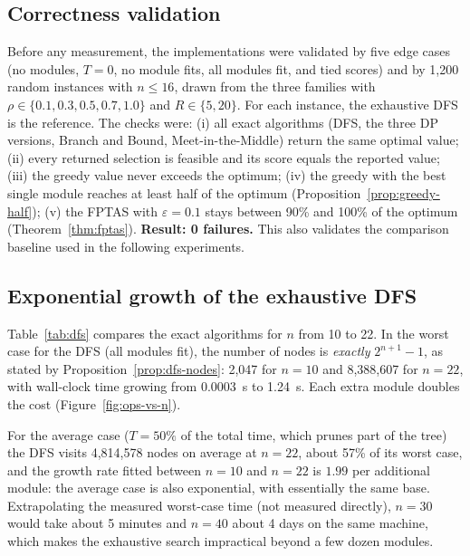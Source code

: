 \subsection{Correctness validation}

Before any measurement, the implementations were validated by five edge cases (no modules, $T=0$, no module fits, all modules fit, and tied scores) and by 1,200 random instances with $n\le16$, drawn from the three families with $\rho\in\{0.1,0.3,0.5,0.7,1.0\}$ and $R\in\{5,20\}$. For each instance, the exhaustive DFS is the reference. The checks were: (i) all exact algorithms (DFS, the three DP versions, Branch and Bound, Meet-in-the-Middle) return the same optimal value; (ii) every returned selection is feasible and its score equals the reported value; (iii) the greedy value never exceeds the optimum; (iv) the greedy with the best single module reaches at least half of the optimum (Proposition~\ref{prop:greedy-half}); (v) the FPTAS with $\varepsilon=0.1$ stays between 90\% and 100\% of the optimum (Theorem~\ref{thm:fptas}). \textbf{Result: 0 failures.} This also validates the comparison baseline used in the following experiments.

\subsection{Exponential growth of the exhaustive DFS}\label{sec:exp-dfs}

Table~\ref{tab:dfs} compares the exact algorithms for $n$ from 10 to 22. In the worst case for the DFS (all modules fit), the number of nodes is \emph{exactly} $2^{n+1}-1$, as stated by Proposition~\ref{prop:dfs-nodes}: 2,047 for $n=10$ and 8,388,607 for $n=22$, with wall-clock time growing from 0.0003~s to 1.24~s. Each extra module doubles the cost (Figure~\ref{fig:ops-vs-n}).

\begin{table}[h]
\centering
\caption{Exact algorithms for small $n$ (uncorrelated family, $R=20$). Operation counts; the average case uses five instances per size.}\label{tab:dfs}
\small

\end{table}

For the average case ($T=50\%$ of the total time, which prunes part of the tree) the DFS visits 4,814,578 nodes on average at $n=22$, about 57\% of its worst case, and the growth rate fitted between $n=10$ and $n=22$ is $1.99$ per additional module: the average case is also exponential, with essentially the same base. Extrapolating the measured worst-case time (not measured directly), $n=30$ would take about 5 minutes and $n=40$ about 4 days on the same machine, which makes the exhaustive search impractical beyond a few dozen modules.

